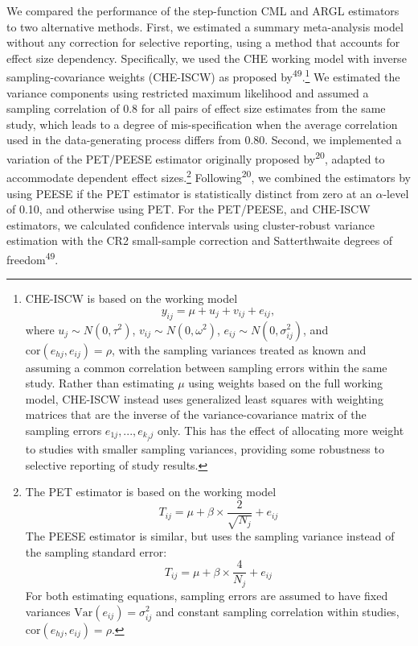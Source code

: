 \documentclass[
  american,
  man, donotrepeattitle,floatsintext]{apa7}
\begin{document}
We compared the performance of the step-function CML and ARGL estimators to two alternative methods.
First, we estimated a summary meta-analysis model without any correction for selective reporting, using a method that accounts for effect size dependency.
Specifically, we used the CHE working model with inverse sampling-covariance weights (CHE-ISCW) as proposed by\textsuperscript{49}.\footnote{CHE-ISCW is based on the working model
  \begin{equation}
    \label{eq:che}
    y_{ij} = \mu + u_j + v_{ij} + e_{ij},
    \end{equation}
  where \(u_j \sim N(0, \tau^2)\), \(v_{ij} \sim N(0, \omega^2)\), \(e_{ij} \sim N(0, \sigma_{ij}^2)\), and \(\text{cor}(e_{hj},e_{ij}) = \rho\), with the sampling variances treated as known and assuming a common correlation between sampling errors within the same study.
  Rather than estimating \(\mu\) using weights based on the full working model, CHE-ISCW instead uses generalized least squares with weighting matrices that are the inverse of the variance-covariance matrix of the sampling errors \(e_{1j},...,e_{k_j j}\) only.
  This has the effect of allocating more weight to studies with smaller sampling variances, providing some robustness to selective reporting of study results.}
We estimated the variance components using restricted maximum likelihood and assumed a sampling correlation of 0.8 for all pairs of effect size estimates from the same study, which leads to a degree of mis-specification when the average correlation used in the data-generating process differs from 0.80.
Second, we implemented a variation of the PET/PEESE estimator originally proposed by\textsuperscript{20}, adapted to accommodate dependent effect sizes.\footnote{The PET estimator is based on the working model \begin{equation}
    \label{eq:pet}
    T_{ij} = \mu + \beta \times \frac{2}{\sqrt{N_j}} + e_{ij}
    \end{equation}
  The PEESE estimator is similar, but uses the sampling variance instead of the sampling standard error: \begin{equation}
    \label{eq:peese}
    T_{ij} = \mu + \beta \times \frac{4}{N_j} + e_{ij}
    \end{equation}
  For both estimating equations, sampling errors are assumed to have fixed variances
  \(\text{Var}(e_{ij}) = \sigma_{ij}^2\) and constant sampling correlation within studies, \(\text{cor}(e_{hj},e_{ij} )=\rho\).}
Following\textsuperscript{20}, we combined the estimators by using PEESE if the PET estimator is statistically distinct from zero at an \(\alpha\)-level of 0.10, and otherwise using PET.
For the PET/PEESE, and CHE-ISCW estimators, we calculated confidence intervals using cluster-robust variance estimation with the CR2 small-sample correction and Satterthwaite degrees of freedom\textsuperscript{49}.
\end{document}
